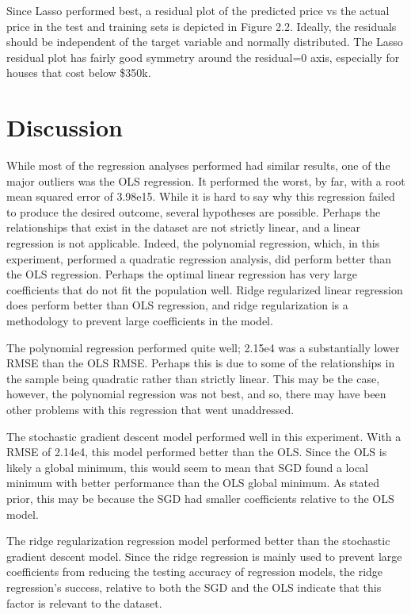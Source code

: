 \documentclass[12pt]{article}
\begin{document}
\par Since Lasso performed best, a residual plot of the predicted price vs the actual price in the test and training sets is depicted in Figure 2.2. Ideally, the residuals should be independent of the target variable and normally distributed. The Lasso residual plot has fairly good symmetry around the residual=0 axis, especially for houses that cost below \$350k. 

\section*{Discussion}
\par \qquad While most of the regression analyses performed had similar results, one of the major outliers was the OLS regression. It performed the worst, by far, with a root mean squared error of 3.98e15. While it is hard to say why this regression failed to produce the desired outcome, several hypotheses are possible. Perhaps the relationships that exist in the dataset are not strictly linear, and a linear regression is not applicable. Indeed, the polynomial regression, which, in this experiment, performed a quadratic regression analysis, did perform better than the OLS regression. Perhaps the optimal linear regression has very large coefficients that do not fit the population well. Ridge regularized linear regression does perform better than OLS regression, and ridge regularization is a methodology to prevent large coefficients in the model.
\par The polynomial regression performed quite well; 2.15e4 was a substantially lower RMSE than the OLS RMSE. Perhaps this is due to some of the relationships in the sample being quadratic rather than strictly linear. This may be the case, however, the polynomial regression was not best, and so, there may have been other problems with this regression that went unaddressed.
\par The stochastic gradient descent model performed well in this experiment. With a RMSE of 2.14e4, this model performed better than the OLS. Since the OLS is likely a global minimum, this would seem to mean that SGD found a local minimum with better performance than the OLS global minimum. As stated prior, this may be because the SGD had smaller coefficients relative to the OLS model.
\par The ridge regularization regression model performed better than the stochastic gradient descent model. Since the ridge regression is mainly used to prevent large coefficients from reducing the testing accuracy of regression models, the ridge regression’s success, relative to both the SGD and the OLS indicate that this factor is relevant to the dataset.
\end{document}
